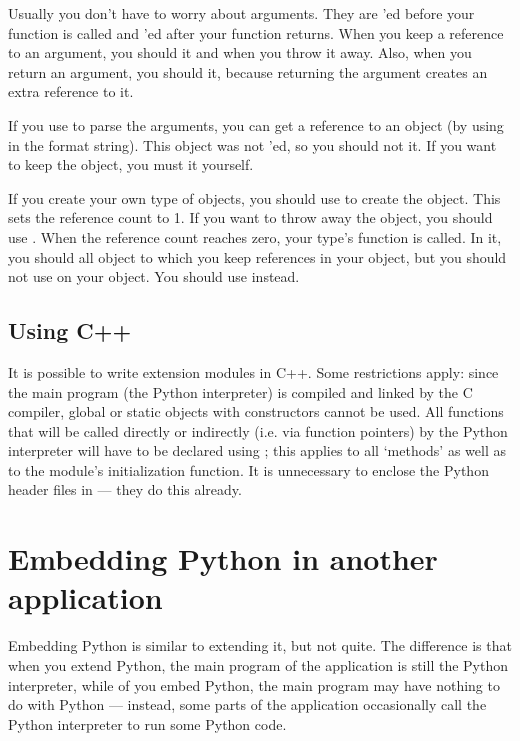 Usually you don't have to worry about arguments.  They are
'ed before your function is called and
'ed after your function returns.  When you keep a
reference to an argument, you should  it and
 when you throw it away.  Also, when you return an
argument, you should  it, because returning the
argument creates an extra reference to it.

If you use  to parse the arguments, you can get a
reference to an object (by using  in the format string).  This
object was not 'ed, so you should not 
it.  If you want to keep the object, you must  it
yourself.

If you create your own type of objects, you should use 
to create the object.  This sets the reference count to 1.  If you
want to throw away the object, you should use .  When
the reference count reaches zero, your type's 
function is called.  In it, you should  all object to
which you keep references in your object, but you should not use
 on your object.  You should use  instead.


\section{Using C++}

It is possible to write extension modules in C++.  Some restrictions
apply: since the main program (the Python interpreter) is compiled and
linked by the C compiler, global or static objects with constructors
cannot be used.  All functions that will be called directly or
indirectly (i.e. via function pointers) by the Python interpreter will
have to be declared using ; this applies to all
`methods' as well as to the module's initialization function.
It is unnecessary to enclose the Python header files in
 --- they do this already.


\chapter{Embedding Python in another application}

Embedding Python is similar to extending it, but not quite.  The
difference is that when you extend Python, the main program of the
application is still the Python interpreter, while of you embed
Python, the main program may have nothing to do with Python ---
instead, some parts of the application occasionally call the Python
interpreter to run some Python code.

